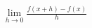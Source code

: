 \documentclass[preview]{standalone}
\begin{document}
\begin{align*}
\lim_{h \to 0} \frac{f(x+h) - f(x)}{h}
\end{align*}
\end{document}
